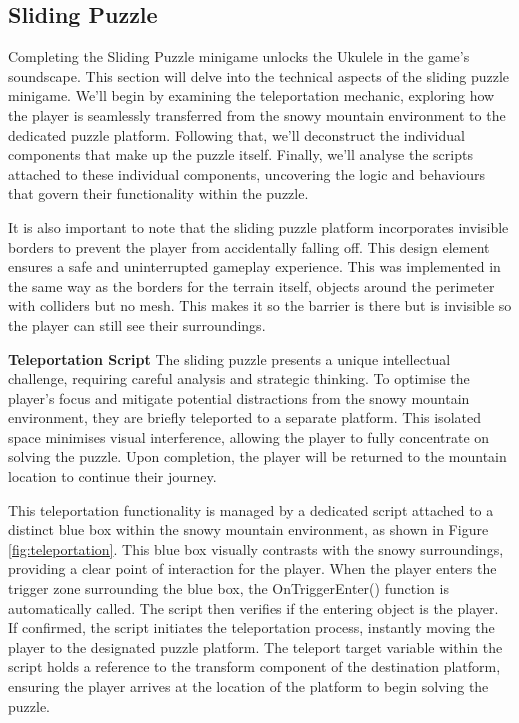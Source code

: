 \documentclass{l4proj}
\begin{document}


\subsection{Sliding Puzzle}
Completing the Sliding Puzzle minigame unlocks the Ukulele in the game's soundscape. This section will delve into the technical aspects of the sliding puzzle minigame. We'll begin by examining the teleportation mechanic, exploring how the player is seamlessly transferred from the snowy mountain environment to the dedicated puzzle platform. Following that, we'll deconstruct the individual components that make up the puzzle itself. Finally, we'll analyse the scripts attached to these individual components, uncovering the logic and behaviours that govern their functionality within the puzzle.

It is also important to note that the sliding puzzle platform incorporates invisible borders to prevent the player from accidentally falling off. This design element ensures a safe and uninterrupted gameplay experience. This was implemented in the same way as the borders for the terrain itself, objects around the perimeter with colliders but no mesh. This makes it so the barrier is there but is invisible so the player can still see their surroundings.

\textbf{Teleportation Script} \newline
The sliding puzzle presents a unique intellectual challenge, requiring careful analysis and strategic thinking. To optimise the player's focus and mitigate potential distractions from the snowy mountain environment, they are briefly teleported to a separate platform. This isolated space minimises visual interference, allowing the player to fully concentrate on solving the puzzle. Upon completion, the player will be returned to the mountain location to continue their journey.

This teleportation functionality is managed by a dedicated script attached to a distinct blue box within the snowy mountain environment, as shown in Figure \ref{fig:teleportation}. This blue box visually contrasts with the snowy surroundings, providing a clear point of interaction for the player. When the player enters the trigger zone surrounding the blue box, the OnTriggerEnter() function is automatically called. The script then verifies if the entering object is the player. If confirmed, the script initiates the teleportation process, instantly moving the player to the designated puzzle platform. The teleport target variable within the script holds a reference to the transform component of the destination platform, ensuring the player arrives at the location of the platform to begin solving the puzzle.
\end{document}
